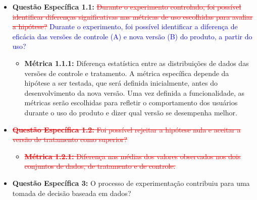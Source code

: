 \begin{itemize}
    \item \textbf{Questão Específica 1.1:}  \textcolor{red}{\st{Durante o experimento controlado, foi possível identificar diferenças significativas nas métricas de uso escolhidas para avaliar a hipótese?}}  \textcolor{blue}{Durante o experimento, foi possível identificar a diferença de eficácia das versões de controle (A) e nova versão (B) do produto, a partir do uso?}

 
    \begin{itemize}
        \item \textbf{Métrica 1.1.1:} Diferença estatística entre as distribuições de dados das versões de controle e tratamento. A métrica específica depende da hipótese a ser testada, que será definida inicialmente, antes do desenvolvimento da nova versão. Uma vez definida a funcionalidade, as métricas serão escolhidas para refletir o comportamento dos usuários durante o uso do produto e dizer qual versão se desempenha melhor. 
    
     

        
       
    \end{itemize}
    
    
    
    \item\textcolor{red}{\st{\textbf{Questão Específica 1.2:} Foi possível rejeitar a hipótese nula e aceitar a versão de tratamento como superior?}}

    \begin{itemize}
        \item\textcolor{red}{\st{\textbf{Métrica 1.2.1:} Diferença nas médias dos valores observados nos dois conjuntos de dados, de tratamento e de controle.}}
    \end{itemize}
  
    \item\textbf{Questão Específica 3:} O processo de experimentação contribuiu para uma tomada de decisão baseada em dados?


\end{itemize}
